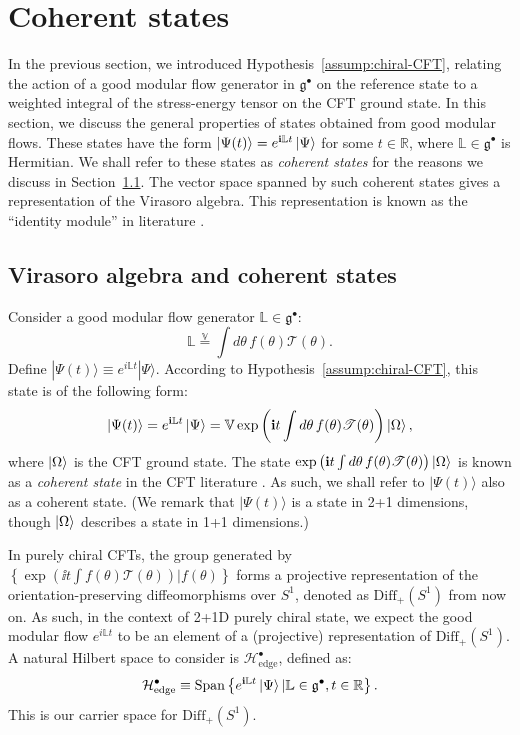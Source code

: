 \documentclass[12pt, nofootinbib]{article}
\theoremstyle{plain}
\theoremstyle{assumption}
\theoremstyle{definition}
\theoremstyle{plain}
\theoremstyle{plain}
\theoremstyle{plain}
\theoremstyle{plain}
\theoremstyle{plain}
\newcommand{\calH}{{\mathcal H}}
\def\veq{\stackrel{\mathbb{V}}{=}}
\def\Lb{\mathbb{L}}
\def\Tcft{\mathscr{T}}
\def\({\left(}
\def\){\right)}
\def\gc{\mathfrak{g}^{\bullet}}
\def\calHc{\calH^{\bullet}_{\mathrm{edge}}}
\begin{document}
\section{Coherent states}\label{sec:edge-subspace-coherent}

In the previous section, we introduced Hypothesis~\ref{assump:chiral-CFT}, relating the action of a good modular flow generator in $\gc$ on the reference state to a weighted integral of the stress-energy tensor on the CFT ground state. In this section, we discuss the general properties of states obtained from good modular flows. These states have the form $\ket{\Psi(t)} = e^{\ii \Lb t}\ket{\Psi}$ for some $t\in\mathbb{R}$, where $\Lb \in \gc$ is Hermitian. We shall refer to these states as \emph{coherent states} for the reasons we discuss in Section~\ref{subsec:virasoro_and_coherent_states}. The vector space spanned by such coherent states gives a representation of the Virasoro algebra. This representation is known as the ``identity module'' in literature \cite{francesco2012conformal}. 

\subsection{Virasoro algebra and coherent states}
\label{subsec:virasoro_and_coherent_states}

Consider a good modular flow generator $\Lb\in \gc$:
\begin{equation}
    \Lb \veq \int d\theta \,f(\theta) \Tcft (\theta).
\end{equation}
Define $|\Psi(t)\rangle \equiv e^{i\Lb t} |\Psi\rangle$. According to Hypothesis~\ref{assump:chiral-CFT}, this state is of the following form:
\begin{equation}
    \ket{\Psi(t)} = e^{\ii \Lb t}\ket{\Psi} = \mathbb{V} \exp\( \ii t\int d\theta \, f(\theta)\Tcft(\theta) \)\ket{\Omega},
\end{equation}
where $\left|\Omega\right\rangle$ is the CFT ground state. The state $\exp\left( \ii t\int d\theta \, f(\theta)\Tcft(\theta) \right)\ket{\Omega}$ is known as a \emph{coherent state} in the CFT literature \cite{Hollands2019}. As such, we shall refer to $|\Psi(t)\rangle$ also as a coherent state. (We remark that $|\Psi(t)\rangle$ is a state in 2+1 dimensions, though $\left|\Omega\right\rangle$ describes a state in 1+1 dimensions.)

In purely chiral CFTs, the group generated by $\left\{ \exp\left( \ii t\int f(\theta)\Tcft(\theta) \right)|f(\theta)\right\}$
forms a projective representation of the orientation-preserving diffeomorphisms over $S^1$, denoted as $\mathrm{Diff}_{+}(S^1)$ from now on. As such, in the context of 2+1D purely chiral state, we expect the good modular flow $e^{i\Lb t}$ to be an element of a (projective) representation of $\mathrm{Diff}_{+}(S^1)$. A natural Hilbert space to consider is $\calHc$, defined as:
\begin{equation}
    \calHc \equiv \mathrm{Span}\left\{ e^{\ii \Lb t}\ket{\Psi}| \Lb \in \gc,t\in\mathbb{R} \right\}.
\end{equation}
This is our carrier space for $\mathrm{Diff}_{+}(S^1)$. 
\end{document}
